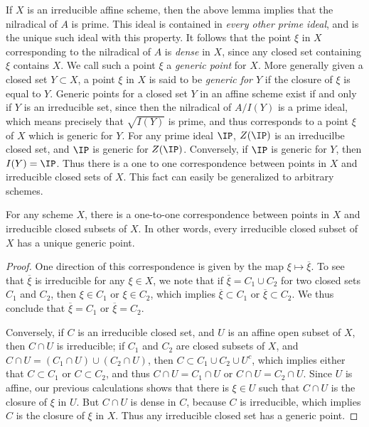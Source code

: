 If $X$ is an irreducible affine scheme, then the above lemma implies that the nilradical of $A$ is prime. This ideal is contained in \emph{every other prime ideal}, and is the unique such ideal with this property. It follows that the point $\xi$ in $X$ corresponding to the nilradical of $A$ is \emph{dense} in $X$, since any closed set containing $\xi$ contains $X$. We call such a point $\xi$ a \emph{generic point} for $X$. More generally given a closed set $Y \subset X$, a point $\xi$ in $X$ is said to be \emph{generic for $Y$} if the closure of $\xi$ is equal to $Y$. Generic points for a closed set $Y$ in an affine scheme exist if and only if $Y$ is an irreducible set, since then the nilradical of $A/I(Y)$ is a prime ideal, which means precisely that $\sqrt{I(Y)}$ is prime, and thus corresponds to a point $\xi$ of $X$ which is generic for $Y$. For any prime ideal $\IP$, $Z(\IP)$ is an irreducilbe closed set, and $\IP$ is generic for $Z(\IP)$. Conversely, if $\IP$ is generic for $Y$, then $I(Y) = \IP$. Thus there is a one to one correspondence between points in $X$ and irreducible closed sets of $X$. This fact can easily be generalized to arbitrary schemes.

\begin{theorem}
    For any scheme $X$, there is a one-to-one correspondence between points in $X$ and irreducible closed subsets of $X$. In other words, every irreducible closed subset of $X$ has a unique generic point.
\end{theorem}
\begin{proof}
    One direction of this correspondence is given by the map $\xi \mapsto \overline{\xi}$. To see that $\overline{\xi}$ is irreducible for any $\xi \in X$, we note that if $\overline{\xi} = C_1 \cup C_2$ for two closed sets $C_1$ and $C_2$, then $\xi \in C_1$ or $\xi \in C_2$, which implies $\overline{\xi} \subset C_1$ or $\overline{\xi} \subset C_2$. We thus conclude that $\overline{\xi} = C_1$ or $\overline{\xi} = C_2$.

    Conversely, if $C$ is an irreducible closed set, and $U$ is an affine open subset of $X$, then $C \cap U$ is irreducible; if $C_1$ and $C_2$ are closed subsets of $X$, and $C \cap U = (C_1 \cap U) \cup (C_2 \cap U)$, then $C \subset C_1 \cup C_2 \cup U^c$, which implies either that $C \subset C_1$ or $C \subset C_2$, and thus $C \cap U = C_1 \cap U$ or $C \cap U = C_2 \cap U$. Since $U$ is affine, our previous calculations shows that there is $\xi \in U$ such that $C \cap U$ is the closure of $\xi$ in $U$. But $C \cap U$ is dense in $C$, because $C$ is irreducible, which implies $C$ is the closure of $\xi$ in $X$. Thus any irreducible closed set has a generic point.
\end{proof}

